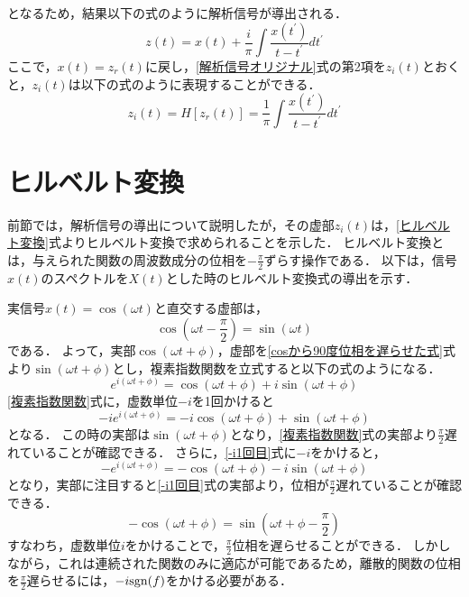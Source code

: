 %
となるため，結果以下の式のように解析信号が導出される．
\begin{equation}
    \label{解析信号オリジナル}
    z(t) = x(t) + \frac{i}{\pi} \int \frac{x(t^{\prime})}{t - t^{\prime}} dt^{\prime}
\end{equation}
%
ここで，$x(t) = z_{r}(t)$に戻し，\ref{解析信号オリジナル}式の第2項を$z_{i}(t)$とおくと，$z_{i}(t)$は以下の式のように表現することができる．
\begin{equation}
    \label{ヒルベルト変換}
    z_{i}(t) = H[z_{r}(t)] = \frac{1}{\pi} \int \frac{x(t^{\prime})}{t - t^{\prime}} dt^{\prime}
\end{equation}
%
\section{ヒルベルト変換}
前節では，解析信号の導出について説明したが，その虚部$z_{i}(t)$は，\ref{ヒルベルト変換}式よりヒルベルト変換で求められることを示した．
ヒルベルト変換とは，与えられた関数の周波数成分の位相を$-\frac{\pi}{2}$ずらす操作である．
以下は，信号$x(t)$のスペクトルを$X(t)$とした時のヒルベルト変換式の導出を示す．

実信号$x(t) =\cos (\omega t)$と直交する虚部は，
\begin{equation}
    \label{cosから90度位相を遅らせた式}
    \cos (\omega t - \frac{\pi}{2}) =\sin (\omega t)
\end{equation}
である．
%
よって，実部$\cos (\omega t + \phi)$，虚部を\ref{cosから90度位相を遅らせた式}式より$\sin (\omega t + \phi)$とし，複素指数関数を立式すると以下の式のようになる．
\begin{equation}
    \label{複素指数関数}
    e^{i(\omega t + \phi)} = \cos (\omega t + \phi) + i \sin(\omega t + \phi)
\end{equation}
\ref{複素指数関数}式に，虚数単位$-i$を1回かけると
\begin{equation}
    \label{-i1回目}
    -i e^{i(\omega t + \phi)} = -i \cos (\omega t + \phi) + \sin(\omega t + \phi)
\end{equation}
となる．
この時の実部は$\sin(\omega t + \phi)$となり，\ref{複素指数関数}式の実部より$\frac{\pi}{2}$遅れていることが確認できる．
%
さらに，\ref{-i1回目}式に$-i$をかけると，
\begin{equation}
    -e^{i(\omega t + \phi)} = -\cos(\omega t + \phi) - i \sin(\omega t + \phi)
\end{equation}
となり，実部に注目すると\ref{-i1回目}式の実部より，位相が$\frac{\pi}{2}$遅れていることが確認できる．
%
\begin{equation}
    -\cos(\omega t + \phi) = \sin(\omega t + \phi - \frac{\pi}{2})
\end{equation}
%
すなわち，虚数単位$i$をかけることで，$\frac{\pi}{2}$位相を遅らせることができる．
しかしながら，これは連続された関数のみに適応が可能であるため，離散的関数の位相を$\frac{\pi}{2}$遅らせるには，$-i {\rm{sgn}}(f)$をかける必要がある．
%

